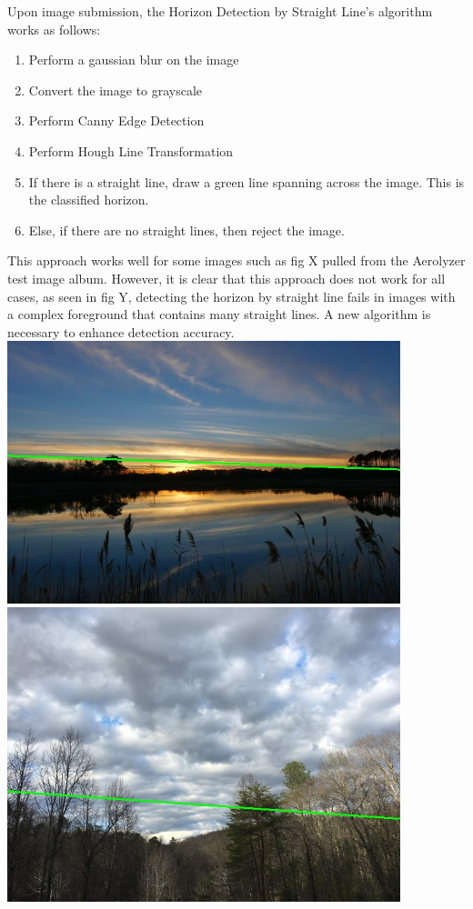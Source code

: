 \documentclass[onecolumn, draftclsnofoot,10pt, compsoc]{IEEEtran}
\begin{document}
\begin{singlespace}
			Upon image submission, the Horizon Detection by Straight Line’s algorithm works as follows:
				
				\begin{enumerate}
					\item Perform a gaussian blur on the image
					\item Convert the image to grayscale
					\item Perform Canny Edge Detection \cite{svm}
					\item Perform Hough Line Transformation \cite{svm}
					\item If there is a straight line, draw a green line spanning across the image.
						This is the classified horizon.
					\item Else, if there are no straight lines, then reject the image.
				\end{enumerate}


				This approach works well for some images such as fig X pulled from the Aerolyzer test image album.
		However, it is clear that this approach does not work for all cases, as seen in fig Y, detecting the horizon by straight line fails in images with a complex foreground that contains many straight lines.
		A new algorithm is necessary to enhance detection accuracy.
				\\
				\includegraphics[width=4.5in,natwidth=640,natheight=427]{images/line1.jpg}
				\\
 				\includegraphics[width=4.5in,natwidth=640,natheight=480]{images/line2.jpg}


\end{singlespace}
\end{document}
